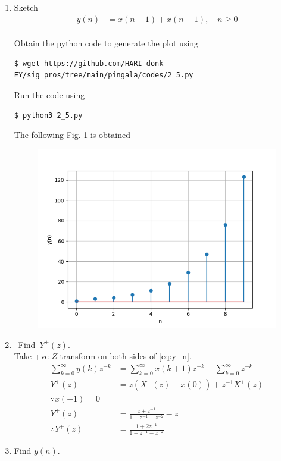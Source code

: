 \documentclass[journal,12pt,twocolumn]{IEEEtran}
\renewcommand\thesection{\arabic{section}}
\begin{document}
\begin{enumerate}[label=\thesection.\arabic*,ref=\thesection.\theenumi]
	\item Sketch
		\begin{align}
			y(n) & = x(n-1) + x(n+1), \quad n \ge 0
			\label{eq:y_n}
		\end{align}
	\solution\\
		Obtain the python code to generate the plot using 
		\begin{lstlisting}
$ wget https://github.com/HARI-donk-EY/sig_pros/tree/main/pingala/codes/2_5.py
		\end{lstlisting}
		Run the code using 
		\begin{lstlisting}
$ python3 2_5.py
		\end{lstlisting}
		The following Fig. \ref{fig:2.5} is obtained
		\begin{figure}[ht]
			\begin{center}
				\includegraphics[width=0.7\columnwidth]{figs/2_5}
			\end{center}
			\label{fig:2.5}    
		\end{figure}
		

	\item Find $Y^{+}(z)$.
	\solution\\
		Take +ve $Z$-transform on both sides of \eqref{eq:y_n}.
		\begin{align}
			\sum_{k=0}^{\infty}y(k)z^{-k} & = \sum_{k=0}^{\infty}x(k+1)z^{-k} + \sum_{k=0}^{\infty}z^{-k}\\
			Y^+(z) & = z\left(X^+(z) - x(0)\right) + z^{-1}X^+(z)\\
			\because x(-1) = 0 & \nonumber \\
			Y^+(z) & = \frac{z+z^{-1}}{1-z^{-1}-z^{-2}}-z\\
			\therefore Y^+(z) & = \frac{1+2z^{-1}}{1-z^{-1}-z^{-2}}
		\end{align}

	\item Find $y(n)$.


\end{enumerate}
\end{document}
